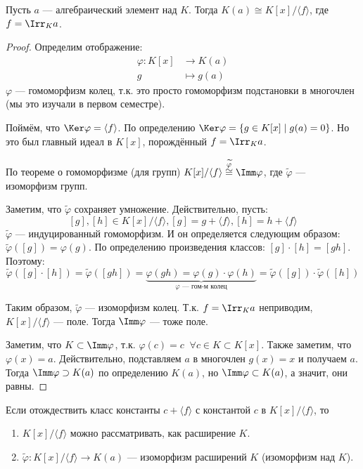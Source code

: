 \begin{theorem}
    Пусть $a$ --- алгебраический элемент над $K$. Тогда $K(a) \cong K[x] / \langle f \rangle$, где \\ $f = \Irr_K a$.
\end{theorem}
\begin{proof}
    Определим отображение:
    \begin{align*}
        \varphi : K[x] &\to K(a) \\
        g &\mapsto g(a) 
    \end{align*}
    $\varphi$ --- гомоморфизм колец, т.к. это просто гомоморфизм подстановки в многочлен (мы это изучали в первом семестре).
    
    Поймём, что $\Ker \varphi = \langle f \rangle$. По определению
    $\Ker \varphi = \{ g \in K[x] \mid g(a) = 0 \}$. Но это был главный идеал в $K[x]$, порождённый $f = \Irr_K a$.

    По теореме о гомоморфизме (для групп) $K[x] / \langle f \rangle \overset{\widetilde{\varphi}}\cong \Imm \varphi$, где $\widetilde{\varphi}$ --- изоморфизм групп.

    Заметим, что $\widetilde{\varphi}$ сохраняет умножение. Действительно, пусть:
    $$[g], [h] \in K[x]/\langle f \rangle, [g] = g + \langle f \rangle, [h] = h + \langle f \rangle$$
    $\widetilde{\varphi}$ --- индуцированный гомоморфизм. 
    И он определяется следующим образом: $\widetilde{\varphi}([g]) = \varphi(g)$. По определению произведения классов: $[g] \cdot [h] = [gh]$. Поэтому:
    $$\widetilde{\varphi}([g] \cdot [h]) = \widetilde{\varphi}([gh]) = \underbrace{\varphi(gh) = \varphi(g) \cdot \varphi(h)}_{\text{$\varphi$ --- гом-м колец}} = \widetilde{\varphi}([g]) \cdot 
    \widetilde{\varphi}([h])$$

    Таким образом, $\widetilde{\varphi}$ --- изоморфизм колец. Т.к. $f = \Irr_K a$ неприводим, $K[x] / \langle f \rangle$ --- поле.
    Тогда $\Imm \varphi$ --- тоже поле. 

    Заметим, что $K \subset \Imm \varphi$, т.к. $\varphi(c) = c \;\; \forall c \in K \subset K[x]$. Также заметим, что $\varphi(x) = a$. Действительно, подставляем $a$ в многочлен $g(x) = x$ и получаем $a$. Тогда $\Imm \varphi \supset K(a)$ по определению $K(a)$, но $\Imm \varphi \subset K(a)$, а значит, они равны.
\end{proof}

\notice Если отождествить класс константы $c + \langle f \rangle$ с константой $c$ в $K[x] / \langle f \rangle$, то 
\begin{enumerate}
    \item $K[x] / \langle f \rangle$ можно рассматривать, как расширение $K$.
    \item $\widetilde{\varphi} : K[x]/ \langle f \rangle \to K(a)$ --- изоморфизм расширений $K$ (изоморфизм над $K$).
\end{enumerate}

